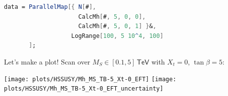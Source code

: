 \documentclass[hyperref={pdfpagelabels=false},ngerman]{beamer}
\newcommand{\eh}[1]{\,\mathsf{#1}}
\newcommand{\MS}{\ensuremath{M_S}}
\begin{document}
\begin{lrbox}{\listbox}\begin{lstlisting}[language=Mathematica]
data = ParallelMap[{ N[#],
                     CalcMh[#, 5, 0, 0],
                     CalcMh[#, 5, 0, 1] }&,
                   LogRange[100, 5 10^4, 100]
       ];
\end{lstlisting}\end{lrbox} %

\begin{frame}{Let's make a plot!}
  Scan over $\MS \in [0.1, 5]\eh{TeV}$ with $X_t = 0$, $\tan\beta = 5$:\\[2em]
  \usebox{\listbox}
\end{frame}

\begin{frame}
  \texttt{[image: plots/HSSUSY/Mh\_MS\_TB-5\_Xt-0\_EFT]}\hfill
  \texttt{[image: plots/HSSUSY/Mh\_MS\_TB-5\_Xt-0\_EFT\_uncertainty]}
\end{frame}
\end{document}
